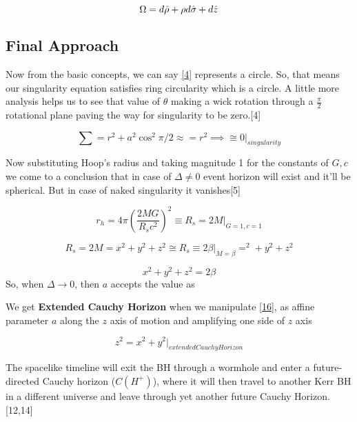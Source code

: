 \documentclass{article}
\begin{document}
\begin{equation}
    \Omega=  d\Hat{\rho}+\rho d\Hat{\sigma}+ d\hat{z}
    \label{8}   
\end{equation}

\subsection{\Large Final Approach}







Now from the basic concepts, we can say \eqref{4} represents a circle.
So, that means our singularity equation satisfies ring circularity which is a circle. A little more analysis helps us to see that value of $\theta$ making a wick rotation through a $\frac{\pi}{2}$ rotational plane paving the way for singularity to be zero.[4]

\begin{equation}
    \sum= r^2+ a^2\cos^2\pi/2\approx=r^2 \implies \cong 0|_{singularity}
\end{equation}

Now substituting Hoop's radius  and taking magnitude 1 for the constants of $G,c$ we come to a conclusion that in case of $\Delta\neq 0$ event horizon will exist and it'll be spherical. But in case of naked singularity it vanishes[5]

\begin{equation}
    r_h=4\pi \left(\frac{2MG}{R_sc^2}\right)^2\equiv R_s= 2M|_{G=1,c=1}
    \label{14} 
\end{equation}

\begin{equation}
    R_s=2M=x^2+y^2+z^2\cong R_s\equiv 2\beta|_{M=\beta}=^2+y^2+z^2
    \label{15}
\end{equation}

\begin{equation}
    x^2+y^2+z^2=2\beta
    \label{16}
\end{equation}
So, when $\Delta\rightarrow 0$, then $a$ accepts the value as

We get \textbf{Extended Cauchy Horizon} when we manipulate \eqref{16}, as affine parameter $a$ along the $z$ axis of motion and amplifying one side of $z$ axis

\begin{equation}
    z^2=x^2+y^2|_{extended Cauchy Horizon}
\end{equation}

The spacelike timeline will exit the BH through a wormhole and enter a future-directed Cauchy horizon ($C(H^+)$), where it will then travel to another Kerr BH in a different universe and leave through yet another future Cauchy Horizon.[12,14]
\end{document}
